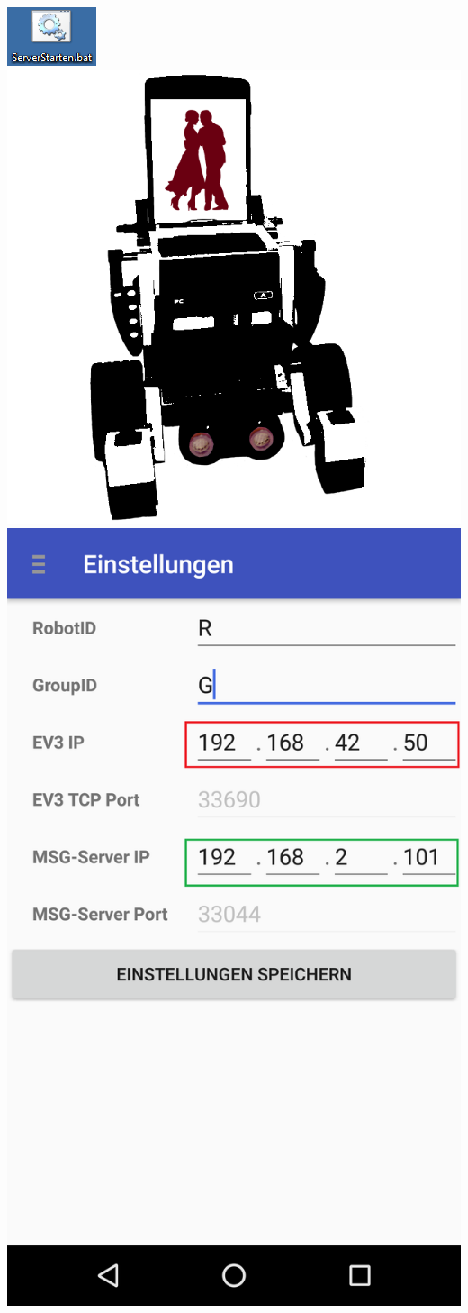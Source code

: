 \documentclass[
	12pt,
	article,
	type=bsc, %
	colorbacktitle,
	instlogo,
	accentcolor=tud1c,
	german,
	twoside
]{tudexercise}
\begin{document}
\begin{enumerate}
\begin{minipage}{.5\textwidth}
\centering
\includegraphics[width=.4\textwidth]{img/serverstartenbat.png}
\includegraphics[width=.2\textwidth]{img/MindrobotWithTango}
\includegraphics[scale=.2]{img/screenshots/settings.png}


\end{minipage}
\end{enumerate}
\end{document}
